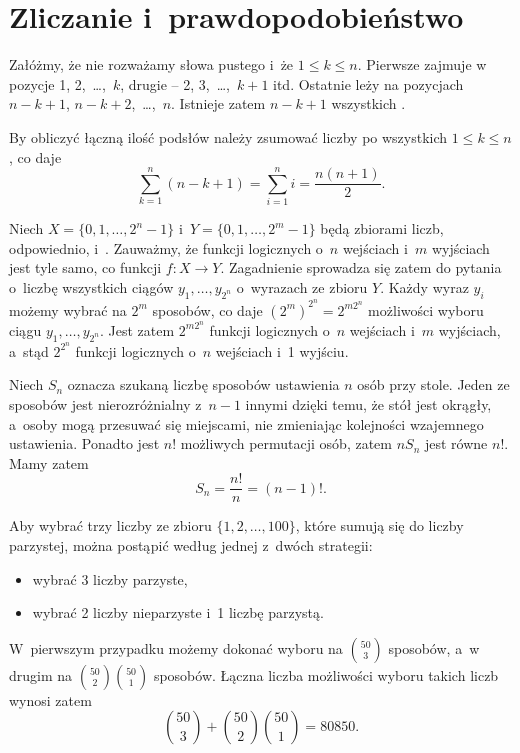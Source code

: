 \chapter{Zliczanie i~prawdopodobieństwo}


\exercise{} %
Załóżmy, że nie rozważamy słowa pustego i~że $1\le k\le n$. Pierwsze  zajmuje w~ pozycje 1, 2,~\dots,~$k$, drugie -- 2, 3,~\dots,~$k+1$ itd. Ostatnie  leży na pozycjach $n-k+1$, $n-k+2$,~\dots,~$n$. Istnieje zatem $n-k+1$ wszystkich  .

By obliczyć łączną ilość podsłów  należy zsumować liczby  po wszystkich $1\le k\le n$, co daje
\[
	\sum_{k=1}^n(n-k+1) = \sum_{i=1}^ni = \frac{n(n+1)}{2}.
\]

\exercise{} %
Niech $X=\{0,1,\dots,2^n-1\}$ i~$Y=\{0,1,\dots,2^m-1\}$ będą zbiorami liczb, odpowiednio,  i~. Zauważmy, że funkcji logicznych o~$n$ wejściach i~$m$ wyjściach jest tyle samo, co funkcji $f\colon X\to Y$. Zagadnienie sprowadza się zatem do pytania o~liczbę wszystkich ciągów $y_1,\dots,y_{2^n}$ o~wyrazach ze zbioru  $Y$. Każdy wyraz $y_i$ możemy wybrać na $2^m$ sposobów, co daje $(2^m)^{2^n} = 2^{m2^n}$ możliwości wyboru ciągu $y_1,\dots,y_{2^n}$. Jest zatem $2^{m2^n}$ funkcji logicznych o~$n$ wejściach i~$m$ wyjściach, a~stąd $2^{2^n}$ funkcji logicznych o~$n$ wejściach i~1 wyjściu.

\exercise{} %
Niech $S_n$ oznacza szukaną liczbę sposobów ustawienia $n$ osób przy stole. Jeden ze sposobów jest nierozróżnialny z~$n-1$ innymi dzięki temu, że stół jest okrągły, a~osoby mogą przesuwać się miejscami, nie zmieniając kolejności wzajemnego ustawienia. Ponadto jest $n!$ możliwych permutacji osób, zatem $nS_n$ jest równe $n!$. Mamy zatem
\[
	S_n = \frac{n!}{n} = (n-1)!.
\]

\exercise{} %
Aby wybrać trzy liczby ze zbioru $\{1,2,\dots,100\}$, które sumują się do liczby parzystej, można postąpić według jednej z~dwóch strategii:
\begin{itemize}
	\item wybrać 3 liczby parzyste,
	\item wybrać 2 liczby nieparzyste i~1 liczbę parzystą.
\end{itemize}
W~pierwszym przypadku możemy dokonać wyboru na $\binom{50}{3}$ sposobów, a~w drugim na $\binom{50}{2}\binom{50}{1}$ sposobów. Łączna liczba możliwości wyboru takich liczb wynosi zatem
\[
	\binom{50}{3}+\binom{50}{2}\binom{50}{1} = 80850.
\]

